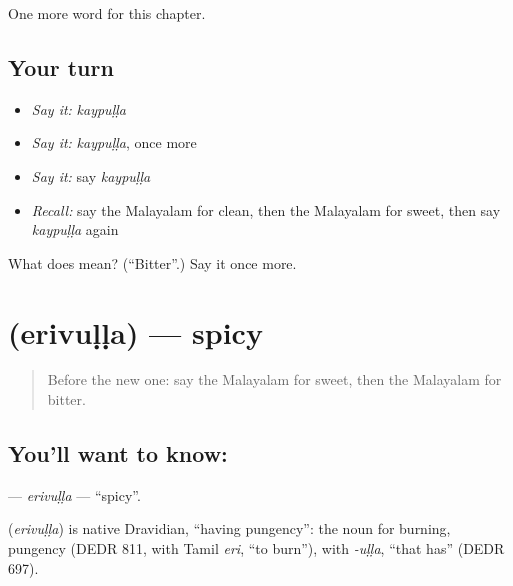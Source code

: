 \begin{grammarlens}[title={What you've built}]
One more word for this chapter.
\end{grammarlens}

\subsection*{Your turn}
\begin{itemize}
\raggedright
  \item \emph{Say it:} \emph{kaypuḷḷa}
  \item \emph{Say it:} \emph{kaypuḷḷa}, once more
  \item \emph{Say it:} say \emph{kaypuḷḷa}
  \item \emph{Recall:} say the Malayalam for clean, then the Malayalam for sweet, then say \emph{kaypuḷḷa} again
\end{itemize}

\begin{tcolorbox}[breakable,colback=teal!4,colframe=teal!35!black,title={Before you move on}]
What does  mean? (\textquotedblleft{}Bitter\textquotedblright{}.) Say it once more.
\end{tcolorbox}
\section[\texorpdfstring{\ml{എരിവുള്ള} (erivuḷḷa)}{എരിവുള്ള (erivuḷḷa)}]{ (erivuḷḷa) — spicy}

\label{lesson:ML-C165-erivulla}



\begin{quote}
Before the new one: say the Malayalam for sweet, then the Malayalam for bitter.
\end{quote}

\subsection*{You'll want to know: }
\textbf{} — \emph{erivuḷḷa} — \textquotedblleft{}spicy\textquotedblright{}.

\begin{cousinweb}
\textbf{} (\emph{erivuḷḷa}) is native Dravidian, \textquotedblleft{}having pungency\textquotedblright{}: the noun for burning, pungency (DEDR 811, with Tamil \emph{eri}, \textquotedblleft{}to burn\textquotedblright{}), with \emph{-uḷḷa}, \textquotedblleft{}that has\textquotedblright{} (DEDR 697).
\end{cousinweb}

